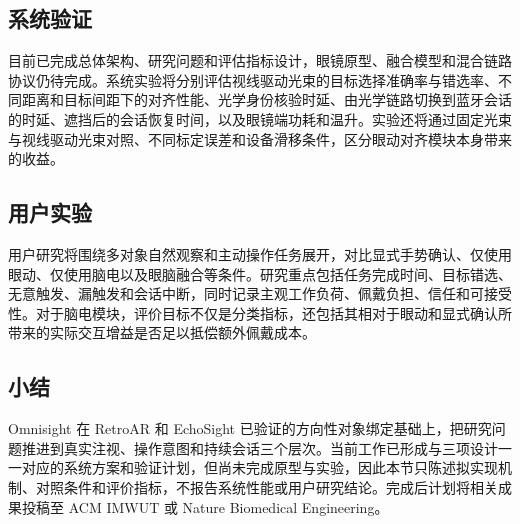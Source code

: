
\subsection{系统验证}
目前已完成总体架构、研究问题和评估指标设计，眼镜原型、融合模型和混合链路协议仍待完成。系统实验将分别评估视线驱动光束的目标选择准确率与错选率、不同距离和目标间距下的对齐性能、光学身份核验时延、由光学链路切换到蓝牙会话的时延、遮挡后的会话恢复时间，以及眼镜端功耗和温升。实验还将通过固定光束与视线驱动光束对照、不同标定误差和设备滑移条件，区分眼动对齐模块本身带来的收益。



\subsection{用户实验}
用户研究将围绕多对象自然观察和主动操作任务展开，对比显式手势确认、仅使用眼动、仅使用脑电以及眼脑融合等条件。研究重点包括任务完成时间、目标错选、无意触发、漏触发和会话中断，同时记录主观工作负荷、佩戴负担、信任和可接受性。对于脑电模块，评价目标不仅是分类指标，还包括其相对于眼动和显式确认所带来的实际交互增益是否足以抵偿额外佩戴成本。



\subsection{小结}
Omnisight 在 RetroAR 和 EchoSight 已验证的方向性对象绑定基础上，把研究问题推进到真实注视、操作意图和持续会话三个层次。当前工作已形成与三项设计一一对应的系统方案和验证计划，但尚未完成原型与实验，因此本节只陈述拟实现机制、对照条件和评价指标，不报告系统性能或用户研究结论。完成后计划将相关成果投稿至 ACM IMWUT 或 Nature Biomedical Engineering。
